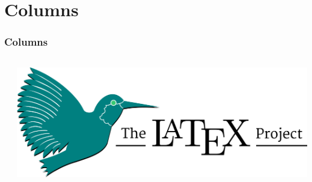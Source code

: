 \documentclass{beamer}
\begin{document}
\section{Columns}
\begin{frame}
    \frametitle{Columns}
    \begin{columns}
        \begin{column}{.3\textwidth}
            \blinditemize
        \end{column}
        \begin{column}{.7\textwidth}
            \includegraphics[width=.95\textwidth]{LaTeX_project_logo_bird.svg.png}
            \blinditemize
        \end{column}
    \end{columns}
\end{frame}
\end{document}
